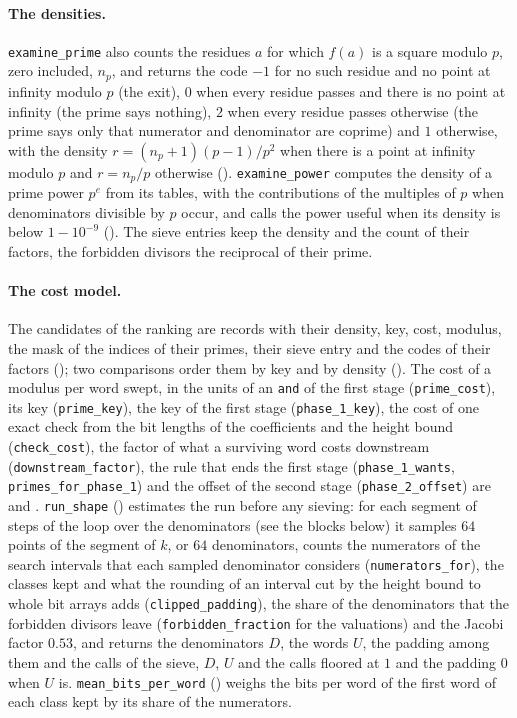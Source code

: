 \paragraph{The densities.} \verb|examine_prime| also counts the residues $a$ for which $f(a)$ is a
square modulo $p$, zero included, $n_p$, and returns the code $-1$ for no such residue and no point
at infinity modulo $p$ (the exit), $0$ when every residue passes and there is no point at infinity
(the prime says nothing), $2$ when every residue passes otherwise (the prime says only that
numerator and denominator are coprime) and $1$ otherwise, with the density
$r = (n_p + 1)(p - 1)/p^2$ when there is a point at infinity modulo $p$ and $r = n_p / p$ otherwise
(). \verb|examine_power| computes the density of a prime power
$p^e$ from its tables, with the contributions of the multiples of $p$ when denominators divisible by
$p$ occur, and calls the power useful when its density is below $1 - 10^{-9}$
(). The sieve entries keep the density and the count of their
factors, the forbidden divisors the reciprocal of their prime.

\paragraph{The cost model.} The candidates of the ranking are records with their density, key, cost,
modulus, the mask of the indices of their primes, their sieve entry and the codes of their factors
(); two comparisons order them by key and by density
(). The cost of a modulus per word swept, in the units of an
\verb|and| of the first stage (\verb|prime_cost|), its key (\verb|prime_key|), the key of the first
stage (\verb|phase_1_key|), the cost of one exact check from the bit lengths of the coefficients and
the height bound (\verb|check_cost|), the factor of what a surviving word costs downstream
(\verb|downstream_factor|), the rule that ends the first stage (\verb|phase_1_wants|,
\verb|primes_for_phase_1|) and the offset of the second stage (\verb|phase_2_offset|) are
 and . \verb|run_shape|
() estimates the run before any sieving: for each segment of
steps of the loop over the denominators (see the blocks below) it samples $64$ points of the segment
of $k$, or $64$ denominators, counts the numerators of the search intervals that each sampled
denominator considers (\verb|numerators_for|), the classes kept and what the rounding of an interval
cut by the height bound to whole bit arrays adds (\verb|clipped_padding|), the share of the
denominators that the forbidden divisors leave (\verb|forbidden_fraction| for the valuations) and
the Jacobi factor $0.53$, and returns the denominators $D$, the words $U$, the padding among them
and the calls of the sieve, $D$, $U$ and the calls floored at $1$ and the padding $0$ when $U$ is.
\verb|mean_bits_per_word| () weighs the bits per word of the
first word of each class kept by its share of the numerators.

